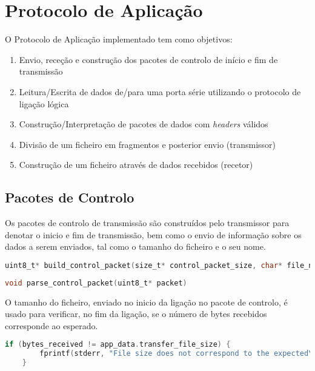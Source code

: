 \section{Protocolo de Aplicação}

O Protocolo de Aplicação implementado tem como objetivos:
\begin{enumerate}
    \item Envio, receção e construção dos pacotes de controlo de início e fim de transmissão
    \item Leitura/Escrita de dados de/para uma porta série utilizando o protocolo de ligação lógica
    \item Construção/Interpretação de pacotes de dados com \textit{headers} válidos
    \item Divisão de um ficheiro em fragmentos e posterior envio (transmissor)
    \item Construção de um ficheiro através de dados recebidos (recetor)
\end{enumerate}


\subsection{Pacotes de Controlo}

Os pacotes de controlo de transmissão são construídos pelo transmissor para denotar o inicio e fim de transmissão, bem como o envio de informação sobre os dados a serem enviados, tal como o tamanho do ficheiro e o seu nome. 

\begin{lstlisting}[language=C, caption=Função que constrói o pacote de controlo (transmissor)]
uint8_t* build_control_packet(size_t* control_packet_size, char* file_name) 
\end{lstlisting}

\begin{lstlisting}[language=C, caption=Função que interpreta o pacote de controlo recebido (recetor)]
void parse_control_packet(uint8_t* packet) 
\end{lstlisting}

O tamanho do ficheiro, enviado no inicio da ligação no pacote de controlo, é usado para verificar, no fim da ligação, se o número de bytes recebidos corresponde ao esperado.

\begin{lstlisting}[language=C, caption=Verificação do tamanho do ficheiro recebido (receiver)]
    if (bytes_received != app_data.transfer_file_size) {
        fprintf(stderr, "File size does not correspond to the expected\n");
    }
\end{lstlisting}

